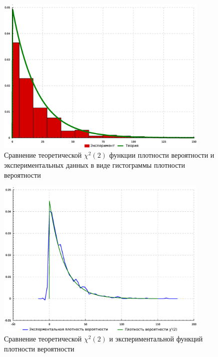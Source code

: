 \begin{figure}[h!]
\centering
\includegraphics[width=0.91\textwidth]{science/final_hist}
\caption{Сравнение теоретической $\chi^2(2)$ функции плотности вероятности и экспериментальных данных в виде гистограммы плотности вероятности}
\label{figure:finalDistrHistr}
\end{figure}

\begin{figure}[h!]
\centering
\includegraphics[width=0.91\textwidth]{science/final}
\caption{Сравнение теоретической $\chi^2(2)$ и экспериментальной функций плотности вероятности}
\label{figure:finalDistr}
\end{figure}